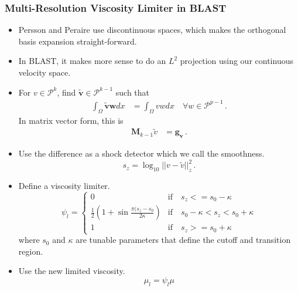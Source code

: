 \documentclass[8pt,xcolor=svgnames]{beamer}
\begin{document}
\begin{frame}\frametitle{Multi-Resolution Viscosity Limiter in BLAST}
\begin{itemize}
\item Persson and Peraire use discontinuous spaces, which makes the orthogonal basis expansion straight-forward.
\item In BLAST, it makes more sense to do an $L^2$ projection using our continuous velocity space.
\item For $v\in\mathcal{P}^k$, find $\mathbf{\tilde v}\in\mathcal{P}^{k-1}$ such that
\begin{align*}
\int_\Omega \mathbf{\tilde vw}dx&=\int_\Omega vwdx\quad\forall w\in\mathcal{P}^{p-1}\,.
\end{align*}
In matrix vector form, this is
\begin{align*}
\mathbf{M}_{k-1}\tilde v&=\mathbf{g_v}\,.
\end{align*}
\item Use the difference as a shock detector which we call the smoothness.
\[
s_z=\log_{10}||v-\tilde v||_z^2\,.
\]
\item Define a viscosity limiter.
\[
\psi_l=
\begin{cases}
0 &\text{if}\quad s_z <= s_0-\kappa\\
\frac{1}{2}\left(1+\sin\frac{\pi(s_z-s_0}{2\kappa}\right) &\text{if}\quad s_0-\kappa < s_z < s_0 + \kappa\\
1 &\text{if}\quad s_z >= s_0 + \kappa
\end{cases}
\]
where $s_0$ and $\kappa$ are tunable parameters that define the cutoff and transition region.
\item Use the new limited viscosity.
\[
\mu_l = \psi_l\mu
\]
\end{itemize}
\end{frame}
\end{document}
